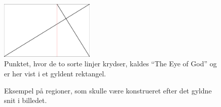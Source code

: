 {\begin{figure}[!h]
    \centering
    \includegraphics[angle=0,width=0.4\textwidth]{afsnit/fremtidigt_arbejde/billeder/eye_of_god}
    \caption[]{Punktet, hvor de to sorte linjer krydser, kaldes ``The Eye
    of God'' og er her vist i et gyldent rektangel.}
    \label{eye_of_god}
\end{figure}

\begin{figure}[!h]
    \centering
    \caption[]{Eksempel på regioner, som skulle være
    konstrueret efter det gyldne snit i billedet.}
    \label{monalisa_fake}
\end{figure}


}
